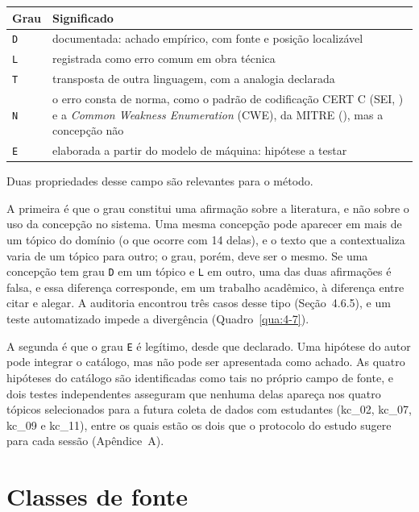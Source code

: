 \begin{quadro}[htbp]
\caption{Graus de procedência}\label{qua:4-1}
\footnotesize
\begin{tabularx}{\textwidth}{|l|X|}
\hline
\textbf{Grau} & \textbf{Significado} \\ \hline
\texttt{D} & documentada: achado empírico, com fonte e posição localizável \\ \hline
\texttt{L} & registrada como erro comum em obra técnica \\ \hline
\texttt{T} & transposta de outra linguagem, com a analogia declarada \\ \hline
\texttt{N} & o erro consta de norma, como o padrão de codificação CERT C (SEI, \citeyear{sei2025}) e a \textit{Common Weakness Enumeration} (CWE), da MITRE (\citeyear{mitre2026}), mas a concepção não \\ \hline
\texttt{E} & elaborada a partir do modelo de máquina: hipótese a testar \\ \hline
\end{tabularx}
\end{quadro}

Duas propriedades desse campo são relevantes para o método.

A primeira é que o grau constitui uma afirmação sobre a literatura, e não sobre o uso da concepção no sistema. Uma mesma concepção pode aparecer em mais de um tópico do domínio (o que ocorre com 14 delas), e o texto que a contextualiza varia de um tópico para outro; o grau, porém, deve ser o mesmo. Se uma concepção tem grau \texttt{D} em um tópico e \texttt{L} em outro, uma das duas afirmações é falsa, e essa diferença corresponde, em um trabalho acadêmico, à diferença entre citar e alegar. A auditoria encontrou três casos desse tipo (Seção~4.6.5), e um teste automatizado impede a divergência (Quadro~\ref{qua:4-7}).

A segunda é que o grau \texttt{E} é legítimo, desde que declarado. Uma hipótese do autor pode integrar o catálogo, mas não pode ser apresentada como achado. As quatro hipóteses do catálogo são identificadas como tais no próprio campo de fonte, e dois testes independentes asseguram que nenhuma delas apareça nos quatro tópicos selecionados para a futura coleta de dados com estudantes (kc\_02, kc\_07, kc\_09 e kc\_11), entre os quais estão os dois que o protocolo do estudo sugere para cada sessão (Apêndice~A).

\section{Classes de fonte}

